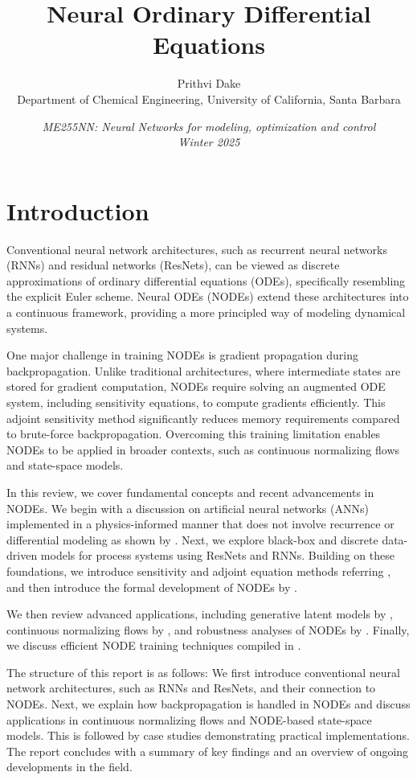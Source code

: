 \documentclass[fontsize=11pt]{article}
\title{\bf{Neural Ordinary Differential Equations}}
\author{Prithvi Dake\\
Department of Chemical Engineering, University of California, Santa Barbara}
\date{\textit{ME255NN: Neural Networks for modeling, optimization and control} \\
\textit{Winter 2025}}
\theoremstyle{definition}
\begin{document}
\maketitle
\section{Introduction}

Conventional neural network architectures, such as recurrent neural networks 
(RNNs) and residual networks (ResNets), can be viewed as discrete approximations
of ordinary differential equations (ODEs), specifically resembling the explicit
Euler scheme. Neural ODEs (NODEs) extend these architectures into a continuous 
framework, providing a more principled way of modeling dynamical systems.

One major challenge in training NODEs is gradient propagation during backpropagation.
Unlike traditional architectures, where intermediate states are stored for
gradient computation, NODEs require solving an augmented ODE system, including 
sensitivity equations, to compute gradients efficiently. This adjoint sensitivity 
method significantly reduces memory requirements compared to brute-force 
backpropagation. Overcoming this training limitation enables NODEs to be 
applied in broader contexts, such as continuous normalizing flows and state-space 
models.

In this review, we cover fundamental concepts and recent advancements in NODEs. 
We begin with a discussion on artificial neural networks (ANNs) implemented in 
a physics-informed manner that does not involve recurrence or differential 
modeling as shown by \cite{raissi:perdikaris:karniadakis:2019}. Next, we explore black-box 
and discrete data-driven models for process systems using ResNets and RNNs. 
Building on these foundations, we introduce sensitivity and adjoint equation 
methods referring \cite{stapor:froehlich:hasenauer:2018}, and then introduce the 
formal development of NODEs by \cite{chen:rubanova:bettencourt:duvenaud:2018}. 

We then review advanced applications, including generative latent models by
\cite{rubanova:chen:duvenaud:2019}, continuous normalizing flows by
\cite{grathwohl:chen:bettencourt:sutskever:duvenaud:2018}, and robustness 
analyses of NODEs by \cite{yan:du:tan:feng:2019}. Finally, we discuss efficient 
NODE training techniques compiled in \cite{finlay:jacobsen:nurbekyan:oberman:2020}.

The structure of this report is as follows: We first introduce conventional 
neural network architectures, such as RNNs and ResNets, and their connection 
to NODEs. Next, we explain how backpropagation is handled in NODEs and discuss 
applications in continuous normalizing flows and NODE-based state-space models. 
This is followed by case studies demonstrating practical implementations. 
The report concludes with a summary of key findings and an overview of ongoing 
developments in the field.
\end{document}
